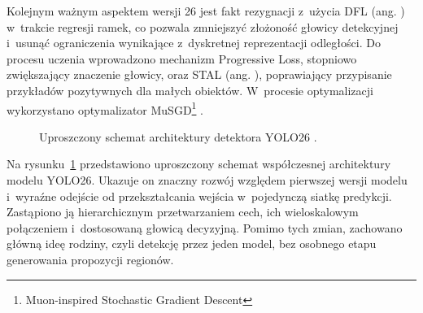 Kolejnym ważnym aspektem wersji 26 jest fakt rezygnacji z~użycia DFL (ang. ) w~trakcie regresji ramek, co pozwala zmniejszyć złożoność głowicy detekcyjnej i~usunąć ograniczenia wynikające z~dyskretnej reprezentacji odległości. Do procesu uczenia wprowadzono mechanizm Progressive Loss, stopniowo zwiększający znaczenie głowicy, oraz STAL (ang. ), poprawiający przypisanie przykładów pozytywnych dla małych obiektów. W~procesie optymalizacji wykorzystano optymalizator MuSGD\footnote{Muon-inspired Stochastic Gradient Descent} \cite{bib:jocher2026ultralyticsyolo26}.

\begin{figure}[ht] %
    \centering

    \caption{Uproszczony schemat architektury detektora YOLO26 \cite{bib:jocher2026ultralyticsyolo26}.}
    \label{fig:yolo26_architektura}
\end{figure}

Na rysunku~\ref{fig:yolo26_architektura} przedstawiono uproszczony schemat współczesnej architektury modelu YOLO26. Ukazuje on znaczny rozwój względem pierwszej wersji modelu i~wyraźne odejście od przekształcania wejścia w~pojedynczą siatkę predykcji. Zastąpiono ją hierarchicznym przetwarzaniem cech, ich wieloskalowym połączeniem i~dostosowaną głowicą decyzyjną. Pomimo tych zmian, zachowano główną ideę rodziny, czyli detekcję przez jeden model, bez osobnego etapu generowania propozycji regionów.

